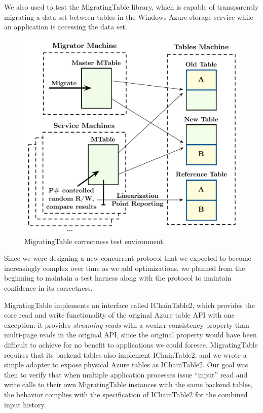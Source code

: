 \def\term#1{\emph{#1}}
We also used \psharp to test the MigratingTable library, which is capable of transparently migrating a data set between tables in the Windows Azure storage service while an application is accessing the data set.

\begin{figure}[t]
\centering
\includegraphics[width=\linewidth]{img/mocked_migration}
\caption{MigratingTable \psharp correctness test environment.}
\label{fig:mockedmigration}
\end{figure}

Since we were designing a new concurrent protocol that we expected to become increasingly complex over time as we add optimizations, we planned from the beginning to maintain a \psharp test harness along with the protocol to maintain confidence in its correctness.

MigratingTable implements an interface called IChainTable2, which provides the core read and write functionality of the original Azure table API with one exception: it provides \term{streaming reads} with a weaker consistency property than multi-page reads in the original API, since the original property would have been difficult to achieve for no benefit to applications we could foresee.  MigratingTable requires that its backend tables also implement IChainTable2, and we wrote a simple adapter to expose physical Azure tables as IChainTable2.  Our goal was then to verify that when multiple application processes issue ``input'' read and write calls to their own MigratingTable instances with the same backend tables, the behavior complies with the specification of IChainTable2 for the combined input history.

